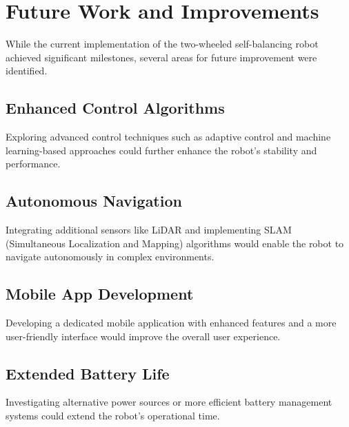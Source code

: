 \section{Future Work and Improvements}

While the current implementation of the two-wheeled self-balancing robot achieved significant milestones, several areas for future improvement were identified.

\subsection{Enhanced Control Algorithms}
Exploring advanced control techniques such as adaptive control and machine learning-based approaches could further enhance the robot's stability and performance.

\subsection{Autonomous Navigation}
Integrating additional sensors like LiDAR and implementing SLAM (Simultaneous Localization and Mapping) algorithms would enable the robot to navigate autonomously in complex environments.

\subsection{Mobile App Development}
Developing a dedicated mobile application with enhanced features and a more user-friendly interface would improve the overall user experience.

\subsection{Extended Battery Life}
Investigating alternative power sources or more efficient battery management systems could extend the robot's operational time.